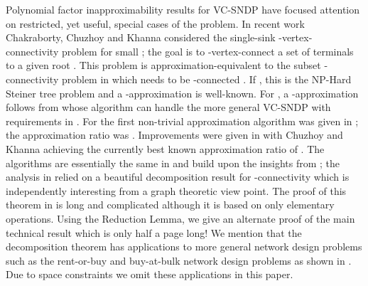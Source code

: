 \documentclass[11pt]{article}
\begin{document}
\smallskip
{} Polynomial
factor inapproximability results for VC-SNDP
\cite{KortsarzKL,ChakCK08} have focused attention on restricted, yet
useful, special cases of the problem. In recent work Chakraborty,
Chuzhoy and Khanna \cite{ChakCK08} considered the single-sink
-vertex-connectivity problem for small ; the goal is to
-vertex-connect a set of terminals  to a given root . This
problem is approximation-equivalent to the subset -connectivity
problem in which  needs to be -connected \cite{ChakCK08}.  If
, this is the NP-Hard Steiner tree problem and a -approximation
is well-known. For , a -approximation follows from
\cite{FleischerJW} whose algorithm can handle the more general VC-SNDP
with requirements in . For  the first non-trivial
approximation algorithm was given in \cite{ChakCK08}; the
approximation ratio was . Improvements were given
in \cite{ChuzhoyK08,ChekuriK08} with Chuzhoy and Khanna
\cite{ChuzhoyK08} achieving the currently best known approximation
ratio of .  The algorithms are essentially the same in
\cite{ChakCK08,ChuzhoyK08,ChekuriK08} and build upon the insights from
\cite{ChakCK08}; the analysis in \cite{ChuzhoyK08} relied on a
beautiful decomposition result for -connectivity which is
independently interesting from a graph theoretic view point. The proof
of this theorem in \cite{ChuzhoyK08} is long and complicated although
it is based on only elementary operations. Using the Reduction Lemma,
we give an alternate proof of the main technical result which is only
half a page long! We mention that the decomposition theorem has
applications to more general network design problems such as the
rent-or-buy and buy-at-bulk network design problems as shown in
\cite{ChekuriK08}.  Due to space constraints we omit these
applications in this paper.
\end{document}
